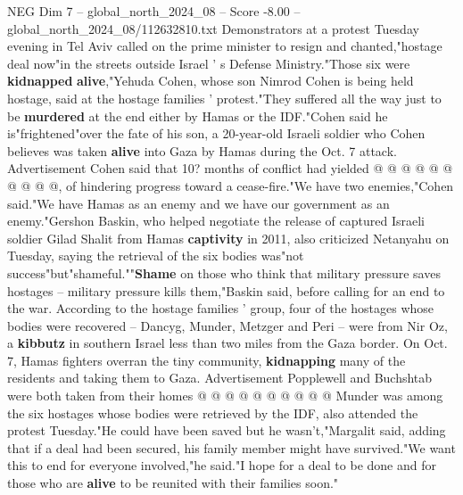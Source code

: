 \begin{textsample}{NEG Dim 7 – global\_north\_2024\_08 – Score -8.00 – global\_north\_2024\_08/112632810.txt}
Demonstrators at a protest Tuesday evening in Tel Aviv called on the prime minister to resign and chanted,"hostage deal now"in the streets outside Israel ' s Defense Ministry."Those six were \textbf{kidnapped} \textbf{alive},"Yehuda Cohen, whose son Nimrod Cohen is being held hostage, said at the hostage families ' protest."They suffered all the way just to be \textbf{murdered} at the end either by Hamas or the IDF."Cohen said he is"frightened"over the fate of his son, a 20-year-old Israeli soldier who Cohen believes was taken \textbf{alive} into Gaza by Hamas during the Oct. 7 attack.
Advertisement Cohen said that 10? months of conflict had yielded @ @ @ @ @ @ @ @ @ @, of hindering progress toward a cease-fire."We have two enemies,"Cohen said."We have Hamas as an enemy and we have our government as an enemy."Gershon Baskin, who helped negotiate the release of captured Israeli soldier Gilad Shalit from Hamas \textbf{captivity} in 2011, also criticized Netanyahu on Tuesday, saying the retrieval of the six bodies was"not success"but"shameful.""\textbf{Shame} on those who think that military pressure saves hostages -- military pressure kills them,"Baskin said, before calling for an end to the war.
According to the hostage families ' group, four of the hostages whose bodies were recovered -- Dancyg, Munder, Metzger and Peri -- were from Nir Oz, a \textbf{kibbutz} in southern Israel less than two miles from the Gaza border.
On Oct. 7, Hamas fighters overran the tiny community, \textbf{kidnapping} many of the residents and taking them to Gaza.
Advertisement Popplewell and Buchshtab were both taken from their homes @ @ @ @ @ @ @ @ @ @ Munder was among the six hostages whose bodies were retrieved by the IDF, also attended the protest Tuesday."He could have been saved but he wasn't,"Margalit said, adding that if a deal had been secured, his family member might have survived."We want this to end for everyone involved,"he said."I hope for a deal to be done and for those who are \textbf{alive} to be reunited with their families soon."

\end{textsample}
